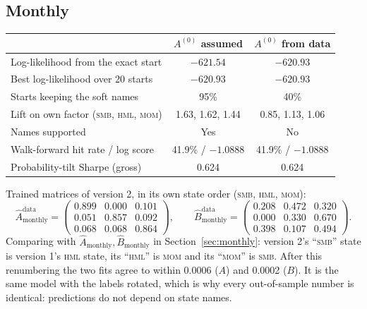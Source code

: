 \documentclass[11pt]{article}
\newcommand{\SMB}{\textsc{smb}}
\newcommand{\HML}{\textsc{hml}}
\newcommand{\MOM}{\textsc{mom}}
\begin{document}
\subsection{Monthly}
\begin{center}
\begin{tabular}{lcc}
\toprule
 & $A^{(0)}$ assumed & $A^{(0)}$ from data \\
\midrule
Log-likelihood from the exact start & $-621.54$ & $-620.93$ \\
Best log-likelihood over 20 starts & $-620.93$ & $-620.93$ \\
Starts keeping the soft names & 95\% & 40\% \\
Lift on own factor (\SMB, \HML, \MOM) & 1.63, 1.62, 1.44 & 0.85, 1.13, 1.06 \\
Names supported & Yes & No \\
Walk-forward hit rate / log score & 41.9\% / $-1.0888$ & 41.9\% / $-1.0888$ \\
Probability-tilt Sharpe (gross) & 0.624 & 0.624 \\
\bottomrule
\end{tabular}
\end{center}
Trained matrices of version 2, in its own state order (\SMB, \HML, \MOM):
\[
\hat A^{\text{data}}_{\text{monthly}}=
\begin{pmatrix}
0.899 & 0.000 & 0.101\\
0.051 & 0.857 & 0.092\\
0.068 & 0.068 & 0.864
\end{pmatrix},
\qquad
\hat B^{\text{data}}_{\text{monthly}}=
\begin{pmatrix}
0.208 & 0.472 & 0.320\\
0.000 & 0.330 & 0.670\\
0.398 & 0.107 & 0.494
\end{pmatrix}.
\]
Comparing with $\hat A_{\text{monthly}},\hat B_{\text{monthly}}$ in Section~\ref{sec:monthly}: version 2's ``\SMB'' state is version 1's \HML{} state, its ``\HML'' is \MOM{} and its ``\MOM'' is \SMB. After this renumbering the two fits agree to within 0.0006 ($A$) and 0.0002 ($B$). It is the same model with the labels rotated, which is why every out-of-sample number is identical: predictions do not depend on state names.
\end{document}
